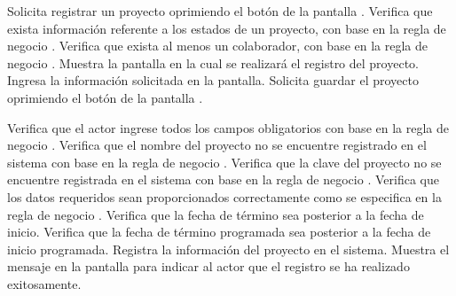  \begin{UCtrayectoria}
    \UCpaso[\UCactor] Solicita registrar un proyecto oprimiendo el botón  de la pantalla .
    \UCpaso[\UCsist] Verifica que exista información referente a los estados de un proyecto, con base en la regla de negocio . 
    \UCpaso[\UCsist] Verifica que exista al menos un colaborador, con base en la regla de negocio . 
    \UCpaso[\UCsist] Muestra la pantalla  en la cual se realizará el registro del proyecto. 
    \UCpaso[\UCactor] Ingresa la información solicitada en la pantalla. \label{cu1.1:ingresaDatos}
    \UCpaso[\UCactor] Solicita guardar el proyecto oprimiendo el botón  de la pantalla .  
    
    \UCpaso[\UCsist] Verifica que el actor ingrese todos los campos obligatorios con base en la regla de negocio  . 
    \UCpaso[\UCsist] Verifica que el nombre del proyecto no se encuentre registrado en el sistema con base en la regla de negocio  . 
    \UCpaso[\UCsist] Verifica que la clave del proyecto no se encuentre registrada en el sistema con base en la regla de negocio  . 
    \UCpaso[\UCsist] Verifica que los datos requeridos sean proporcionados correctamente como se especifica en la regla de negocio .  
    \UCpaso[\UCsist] Verifica que la fecha de término sea posterior a la fecha de inicio. 
    \UCpaso[\UCsist] Verifica que la fecha de término programada sea posterior a la fecha de inicio programada. 
    \UCpaso[\UCsist] Registra la información del proyecto en el sistema.
    \UCpaso[\UCsist] Muestra el mensaje  en la pantalla 
    para indicar al actor que el registro se ha realizado exitosamente.
 \end{UCtrayectoria}

